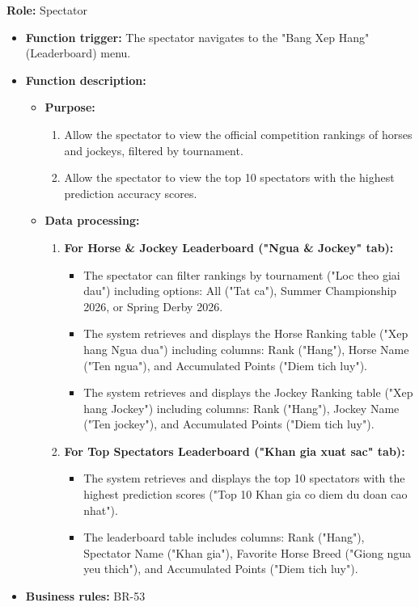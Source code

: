 \textbf{Role:} Spectator

\begin{itemize}
    \item \textbf{Function trigger:} The spectator navigates to the "Bang Xep Hang" (Leaderboard) menu.

    \item \textbf{Function description:}
    \begin{itemize}
        \item \textbf{Purpose:}
        \begin{enumerate}
            \item Allow the spectator to view the official competition rankings of horses and jockeys, filtered by tournament.
            \item Allow the spectator to view the top 10 spectators with the highest prediction accuracy scores.
        \end{enumerate}

        \item \textbf{Data processing:}
        \begin{enumerate}
            \item \textbf{For Horse \& Jockey Leaderboard ("Ngua \& Jockey" tab):}
            \begin{itemize}
                \item The spectator can filter rankings by tournament ("Loc theo giai dau") including options: All ("Tat ca"), Summer Championship 2026, or Spring Derby 2026.
                \item The system retrieves and displays the Horse Ranking table ("Xep hang Ngua dua") including columns: Rank ("Hang"), Horse Name ("Ten ngua"), and Accumulated Points ("Diem tich luy").
                \item The system retrieves and displays the Jockey Ranking table ("Xep hang Jockey") including columns: Rank ("Hang"), Jockey Name ("Ten jockey"), and Accumulated Points ("Diem tich luy").
            \end{itemize}
            \item \textbf{For Top Spectators Leaderboard ("Khan gia xuat sac" tab):}
            \begin{itemize}
                \item The system retrieves and displays the top 10 spectators with the highest prediction scores ("Top 10 Khan gia co diem du doan cao nhat").
                \item The leaderboard table includes columns: Rank ("Hang"), Spectator Name ("Khan gia"), Favorite Horse Breed ("Giong ngua yeu thich"), and Accumulated Points ("Diem tich luy").
            \end{itemize}
        \end{enumerate}
    \end{itemize}
    \item \textbf{Business rules:} BR-53
\end{itemize}

